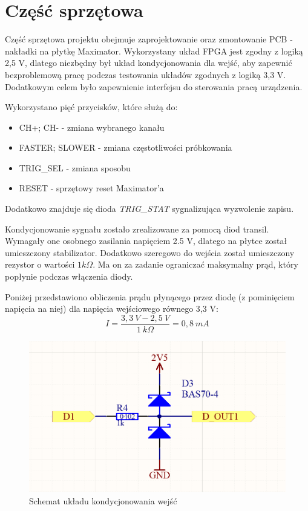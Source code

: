 \chapter{Część sprzętowa}

Część sprzętowa projektu obejmuje zaprojektowanie oraz zmontowanie PCB - nakładki na płytkę Maximator. Wykorzystany układ FPGA jest zgodny z logiką 2,5 V, dlatego niezbędny był układ kondycjonowania dla wejść, aby zapewnić bezproblemową pracę podczas testowania układów zgodnych z logiką 3,3 V. Dodatkowym celem było zapewnienie interfejsu do sterowania pracą urządzenia.

Wykorzystano pięć przycisków, które służą do:
\begin{itemize}
\item CH+; CH- - zmiana wybranego kanału
\item FASTER; SLOWER - zmiana częstotliwości próbkowania
\item TRIG\_SEL - zmiana sposobu 
\item RESET - sprzętowy reset Maximator'a
\end{itemize}
Dodatkowo znajduje się dioda \textit{TRIG\_STAT} sygnalizująca wyzwolenie zapisu. 


Kondycjonowanie sygnału zostało zrealizowane za pomocą diod transil. Wymagały one osobnego zasilania napięciem 2.5 V, dlatego na płytce został umieszczony stabilizator. Dodatkowo szeregowo do wejścia został umieszczony rezystor o wartości $1 k\Omega$. Ma on za zadanie ograniczać maksymalny prąd, który popłynie podczas włączenia diody. 

Poniżej przedstawiono obliczenia prądu płynącego przez diodę (z pominięciem napięcia na niej) dla napięcia wejściowego równego 3,3 V:
\begin{equation}
I = \frac{3,3\ V - 2,5\ V}{1\ k\Omega} = 0,8\ mA
\label{eq:diode_current}
\end{equation}

\begin{figure}[H]
\begin{center}
\includegraphics[width=3.5 in]{images/pin_conditioning.png}
\end{center}
\caption{Schemat układu kondycjonowania wejść}
\label{fig:pin_conditioning}
\end{figure}

